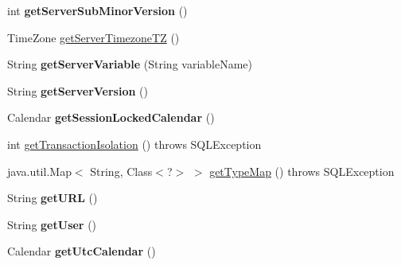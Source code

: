 \begin{DoxyCompactItemize}
\item 
\mbox{\label{classcom_1_1mysql_1_1jdbc_1_1_connection_impl_a77873f0daa6aba30ad71b7c08690b335}} 
int {\bfseries get\+Server\+Sub\+Minor\+Version} ()
\item 
Time\+Zone \mbox{\hyperlink{classcom_1_1mysql_1_1jdbc_1_1_connection_impl_ac1fa3018d7b3c139355f45e55f37fd15}{get\+Server\+Timezone\+TZ}} ()
\item 
\mbox{\label{classcom_1_1mysql_1_1jdbc_1_1_connection_impl_a90275c61120a0db0edde518c15820ea9}} 
String {\bfseries get\+Server\+Variable} (String variable\+Name)
\item 
\mbox{\label{classcom_1_1mysql_1_1jdbc_1_1_connection_impl_a991d35d0701c9ef933a124f40e19b89f}} 
String {\bfseries get\+Server\+Version} ()
\item 
\mbox{\label{classcom_1_1mysql_1_1jdbc_1_1_connection_impl_afee5e604239d322070d24ba52218e46d}} 
Calendar {\bfseries get\+Session\+Locked\+Calendar} ()
\item 
int \mbox{\hyperlink{classcom_1_1mysql_1_1jdbc_1_1_connection_impl_a81ce78e20924c6a752125f2357caa2f3}{get\+Transaction\+Isolation}} ()  throws S\+Q\+L\+Exception 
\item 
java.\+util.\+Map$<$ String, Class$<$?$>$ $>$ \mbox{\hyperlink{classcom_1_1mysql_1_1jdbc_1_1_connection_impl_ace53cfdc1eb07ad6be41058bc4cb4918}{get\+Type\+Map}} ()  throws S\+Q\+L\+Exception 
\item 
\mbox{\label{classcom_1_1mysql_1_1jdbc_1_1_connection_impl_a4212043ccf0b8094122a161068a92627}} 
String {\bfseries get\+U\+RL} ()
\item 
\mbox{\label{classcom_1_1mysql_1_1jdbc_1_1_connection_impl_a1bafc52849959b9d660ca7138527c6a9}} 
String {\bfseries get\+User} ()
\item 
\mbox{\label{classcom_1_1mysql_1_1jdbc_1_1_connection_impl_a60ac712db94b54f7644a939aba8cb1ac}} 
Calendar {\bfseries get\+Utc\+Calendar} ()

\end{DoxyCompactItemize}
